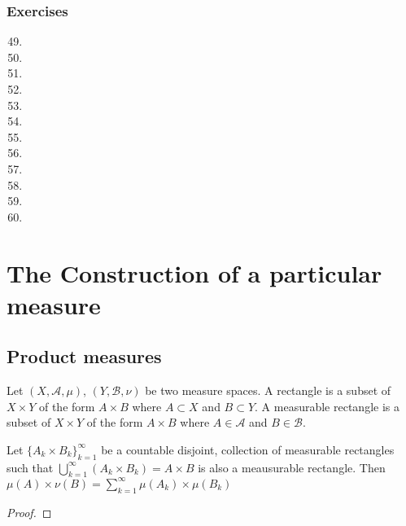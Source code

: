 \subsubsection{Exercises}
\begin{enumerate}
	\setcounter{enumi}{48}
	\item
	\item
	\item
	\item
	\item
	\item
	\item
	\item
	\item
	\item
	\item
	\item
\end{enumerate}


\setcounter{section}{19}
\section{The Construction of a particular measure}
\subsection{Product measures}

\begin{definition}
	Let $(X,\mathcal{A},\mu)$, $(Y,\mathcal{B},\nu)$ be two measure spaces.
	A rectangle is a subset of $X \times Y$ of the form $A \times B$ where $A \subset X$ and $B \subset Y$.
	A measurable rectangle is a subset of $X \times Y$ of the form $A \times B$ where $A \in \mathcal{A}$ and $B \in \mathcal{B}$.
\end{definition}
\begin{lemma}
	Let $\{ A_k \times B_k \}_{k=1}^\infty$ be a countable disjoint, collection of measurable rectangles such that $\displaystyle \bigcup_{k=1}^\infty \left( A_k \times B_k \right) = A \times B$ is also a meausurable rectangle.
	Then
	$\displaystyle \mu(A) \times \nu(B) = \sum_{k=1}^\infty \mu(A_k) \times \mu(B_k) $
\end{lemma}
\begin{proof}
\end{proof}


